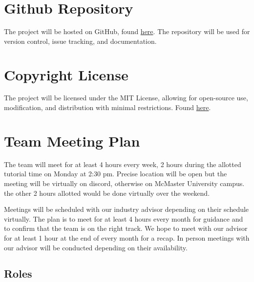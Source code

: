 \documentclass{article}
\begin{document}


\section{Github Repository}
The project will be hosted on GitHub, found \href{https://github.com/lilweege/SyntaxSentinels}{here}.
The repository will be used for version control, issue tracking, and documentation.


\section{Copyright License}
The project will be licensed under the MIT License, allowing for open-source use, modification, 
and distribution with minimal restrictions. Found \href{https://github.com/lilweege/SyntaxSentinels/blob/main/LICENSE}{here}.

\section{Team Meeting Plan}

The team will meet for at least 4 hours every week, 2 hours during the allotted tutorial 
time on Monday at 2:30 pm. Precise location will be open but the meeting will be virtually on discord, 
otherwise on McMaster University campus. the other 2 hours allotted would be done virtually over the weekend.


Meetings will be scheduled with our industry advisor depending on their schedule virtually. 
The plan is to meet for at least 4 hours every month for guidance and to confirm that the team 
is on the right track. We hope to meet with our advisor for at least 1 hour at the end of every 
month for a recap. In person meetings with our advisor will be conducted depending on their availability.

\subsection*{Roles}
\end{document}
